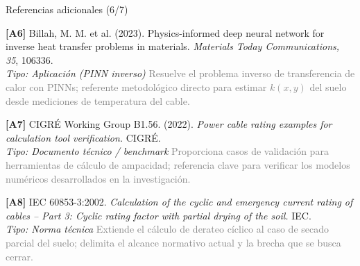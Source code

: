 \documentclass[aspectratio=169]{beamer}
\begin{document}
\begin{frame}{Referencias adicionales (6/7)}
\small\justifying

\textbf{[A6]} Billah, M. M. et al. (2023). Physics-informed deep neural
network for inverse heat transfer problems in materials. \textit{Materials
Today Communications, 35}, 106336.\\
\textcolor{purple!70!black}{\footnotesize\textit{Tipo: Aplicación (PINN inverso)}} \quad
\textcolor{gray}{\footnotesize Resuelve el problema inverso de transferencia de
calor con PINNs; referente metodológico directo para estimar $k(x,y)$ del
suelo desde mediciones de temperatura del cable.}

\medskip
\textbf{[A7]} CIGRÉ Working Group B1.56. (2022). \textit{Power cable rating
examples for calculation tool verification.} CIGRÉ.\\
\textcolor{purple!70!black}{\footnotesize\textit{Tipo: Documento técnico / benchmark}} \quad
\textcolor{gray}{\footnotesize Proporciona casos de validación para herramientas
de cálculo de ampacidad; referencia clave para verificar los modelos
numéricos desarrollados en la investigación.}

\medskip
\textbf{[A8]} IEC 60853-3:2002. \textit{Calculation of the cyclic and
emergency current rating of cables -- Part 3: Cyclic rating factor with
partial drying of the soil.} IEC.\\
\textcolor{purple!70!black}{\footnotesize\textit{Tipo: Norma técnica}} \quad
\textcolor{gray}{\footnotesize Extiende el cálculo de derateo cíclico al caso
de secado parcial del suelo; delimita el alcance normativo actual y la
brecha que se busca cerrar.}
\end{frame}
\end{document}
